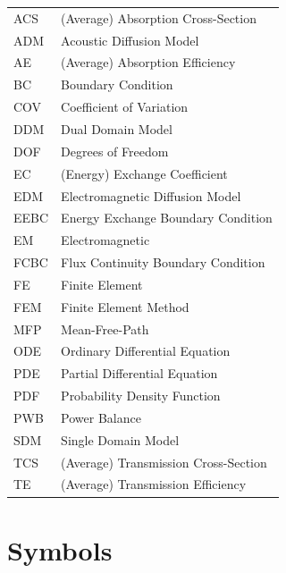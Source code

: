 \documentclass[a4paper]{article}
\numberwithin{equation}{section}
\begin{document}
\begin{supertabular}{m{2cm}l}
ACS              &(Average) Absorption Cross-Section   \\
ADM              &Acoustic Diffusion Model             \\
AE               &(Average) Absorption Efficiency      \\
BC               &Boundary Condition                   \\
COV              &Coefficient of Variation             \\
DDM              &Dual Domain Model                    \\
DOF              &Degrees of Freedom                   \\
EC               &(Energy) Exchange Coefficient        \\
EDM              &Electromagnetic Diffusion Model      \\
EEBC             &Energy Exchange Boundary Condition   \\
EM               &Electromagnetic                      \\
FCBC             &Flux Continuity Boundary Condition   \\
FE               &Finite Element                       \\
FEM              &Finite Element Method                \\
MFP              &Mean-Free-Path                       \\
ODE              &Ordinary Differential Equation       \\
PDE              &Partial Differential Equation        \\
PDF              &Probability Density Function         \\
PWB              &Power Balance                        \\
SDM              &Single Domain Model                  \\
TCS              &(Average) Transmission Cross-Section \\
TE               &(Average) Transmission Efficiency    \\
\end{supertabular}

\newpage
\section*{Symbols}
\label{sc:symbols}
\end{document}
